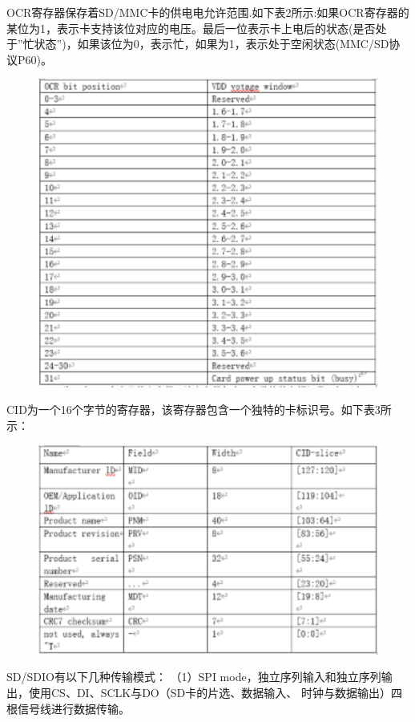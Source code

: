 OCR寄存器保存着SD/MMC卡的供电电允许范围.如下表2所示:如果OCR寄存器的某位为1，表示卡支持该位对应的电压。最后一位表示卡上电后的状态(是否处于”忙状态”)，如果该位为0，表示忙，如果为1，表示处于空闲状态(MMC/SD协议P60)。
\begin{figure}[H]
    \centering
    \includegraphics{figures/06-02-供电点允.png}
\end{figure}

CID为一个16个字节的寄存器，该寄存器包含一个独特的卡标识号。如下表3所示：
\begin{figure}[H]
    \centering
    \includegraphics{figures/06-02-卡标标识.png}
\end{figure}

SD/SDIO有以下几种传输模式：
（1）SPI mode，独立序列输入和独立序列输出，使⽤CS、DI、SCLK与DO（SD卡的片选、数据输入、
时钟与数据输出）四根信号线进行数据传输。


